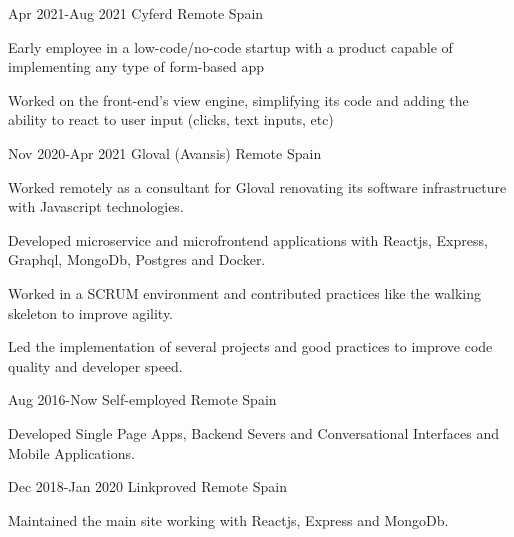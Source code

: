 \documentclass[10pt]{CurriculumVitae}
\begin{document}
      {Apr 2021-Aug 2021}
      {Cyferd}
      {Remote}
      {Spain}
      {
        \item Early employee in a low-code/no-code startup with a product capable of implementing any type of form-based app
        \item Worked on the front-end's view engine, simplifying its code and adding the ability to react to user input (clicks, text inputs, etc)
      }

      {Nov 2020-Apr 2021}
      {Gloval (Avansis)}
      {Remote}
      {Spain}
      {
        \item Worked remotely as a consultant for Gloval renovating its software infrastructure with Javascript technologies.
        \item Developed microservice and microfrontend applications with Reactjs, Express, Graphql, MongoDb, Postgres and Docker.
        \item Worked in a SCRUM environment and contributed practices like the walking skeleton to improve agility.
        \item Led the implementation of several projects and good practices to improve code quality and developer speed. %
      }
 
      {Aug 2016-Now}
      {Self-employed}
      {Remote}
      {Spain}
      {
        \item Developed Single Page Apps, Backend Severs and Conversational Interfaces and Mobile Applications.
      }

      {Dec 2018-Jan 2020}
      {Linkproved}
      {Remote}
      {Spain}
      {
        \item Maintained the main site working with Reactjs, Express and MongoDb.
      }
   
\end{document}
